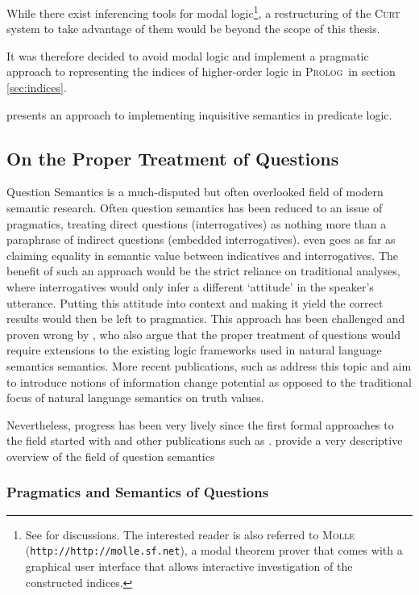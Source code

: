 \documentclass[a4paper]{article}
\newcommand{\term}{\textsf} %
\newcommand{\code}{\texttt} %
\newcommand{\pn}{\textsc} %
\newcommand{\url}[1]{\code{http://#1}} %
\newcommand{\prol}{\pn{Prolog}\mbox{ }}
\begin{document}
While there exist inferencing tools for modal logic\footnote{See %
for discussions. The interested reader is also referred to \pn{Molle}
(\url{http://molle.sf.net}), a modal theorem prover that comes with a graphical user
interface that allows interactive investigation of the constructed indices.},
a restructuring of the \pn{Curt} system to take advantage of them would be
beyond the scope of this thesis.

It was therefore decided to avoid modal logic and implement a pragmatic approach
to representing the indices of higher-order logic in \prol in section
\ref{sec:indices}.

\cite{g:is} presents an approach to implementing inquisitive semantics in
predicate logic.

\subsection{On the Proper Treatment of Questions}

Question Semantics is a much-disputed but often overlooked field of modern
semantic research. Often question semantics has been reduced to an issue of
pragmatics, treating direct questions (interrogatives) as nothing more than a
paraphrase of indirect questions (embedded interrogatives).\cite{tichy}
even goes as far as claiming equality in semantic value between
indicatives and interrogatives. The benefit of such an approach would be the
strict reliance on traditional analyses, where interrogatives would only infer a
different `attitude' in the speaker's utterance. Putting this attitude into
context and making it yield the correct results would then be left to
pragmatics.
This approach has been challenged and proven wrong by \cite{gs:q},
who also argue that the proper treatment of questions would require extensions
to the existing logic frameworks used in natural language semantics semantics.
More recent publications, such as \cite{gal:tmbi}
address this topic and aim to introduce notions of \term{information change
potential} as opposed to the traditional focus of natural language semantics on
\term{truth values}.

Nevertheless, progress has been very lively since the first
formal approaches to the field started with \cite{hamblin:q} and other
publications such as %
. \cite{gs:q} provide a very descriptive overview of the field of question
semantics

\subsubsection{Pragmatics and Semantics of Questions}
\end{document}

